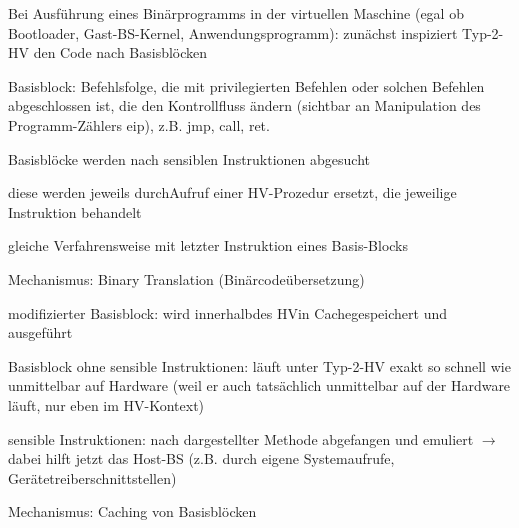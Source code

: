 \documentclass[a4paper]{article}
\begin{document}
\begin{multicols}{3}
    \begin{itemize*}
        \item
        Bei Ausführung eines Binärprogramms in der virtuellen Maschine (egal
        ob Bootloader, Gast-BS-Kernel, Anwendungsprogramm): zunächst
        inspiziert Typ-2-HV den Code nach Basisblöcken
        \begin{itemize*}
            \item Basisblock: Befehlsfolge, die mit privilegierten Befehlen oder solchen Befehlen abgeschlossen ist, die den Kontrollfluss ändern (sichtbar an Manipulation des Programm-Zählers eip), z.B. jmp, call, ret.
        \end{itemize*}
        \item
        Basisblöcke werden nach sensiblen Instruktionen abgesucht
        \item
        diese werden jeweils durchAufruf einer HV-Prozedur ersetzt, die
        jeweilige Instruktion behandelt
        \item
        gleiche Verfahrensweise mit letzter Instruktion eines Basis-Blocks
    \end{itemize*}

    Mechanismus: Binary Translation (Binärcodeübersetzung)

    \begin{itemize*}
        \item
        modifizierter Basisblock: wird innerhalbdes HVin Cachegespeichert und
        ausgeführt
        \item
        Basisblock ohne sensible Instruktionen: läuft unter Typ-2-HV exakt so
        schnell wie unmittelbar auf Hardware (weil er auch tatsächlich
        unmittelbar auf der Hardware läuft, nur eben im HV-Kontext)
        \item
        sensible Instruktionen: nach dargestellter Methode abgefangen und
        emuliert $\rightarrow$ dabei hilft jetzt das Host-BS
        (z.B. durch eigene Systemaufrufe, Gerätetreiberschnittstellen)
    \end{itemize*}

    Mechanismus: Caching von Basisblöcken


\end{multicols}
\end{document}

